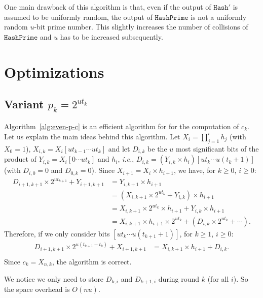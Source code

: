 \documentclass[twoside,envcountsame,runningheads]{llncs}
\newcommand{\Hash}{\ensuremath{\mathtt{Hash}}}
\newcommand{\HashPrime}{\ensuremath{\mathtt{HashPrime}}}
\begin{document}
One main drawback of this algorithm is that, even if the output of $\Hash'$ is assumed to be uniformly random, the output of $\HashPrime$ is not a uniformly random $u$-bit prime number.
This slightly increases the number of collisions of $\HashPrime$ and $u$ has to be increased subsequently.

\section{Optimizations}

\subsection{Variant $p_k = 2^{ut_k}$}

Algorithm~\ref{alg:even-p-c} is an efficient algorithm for for the computation of $c_k$.
Let us explain the main ideas behind this algorithm.
Let $X_i = \prod_{j=1}^i h_j$ (with $X_0 = 1$), $X_{i,k} = X_i[ut_{k-1}\cdots ut_{k}]$ and let $D_{i,k}$ be the $u$ most significant bits of the product of $Y_{i,k} = X_i[0\cdots ut_{k}]$ and $h_i$, {\it i.e.}, $D_{i,k} = (Y_{i,k} \times h_i)[ut_k\cdots u(t_k+1)]$ (with $D_{i,0} = 0$ and $D_{0,k} = 0$).
Since $X_{i+1} = X_i \times h_{i+1}$, we have, for $k \ge 0$, $i \ge 0$:
\begin{align*}
  D_{i+1,k+1} \times 2^{ut_{k+1}} + Y_{i+1,k+1} &= Y_{i,k+1} \times h_{i+1} \\
                 &= (X_{i,k+1} \times 2^{ut_{k}} + Y_{i,k}) \times h_{i+1} \\
                 &= X_{i,k+1} \times 2^{ut_k} \times h_{i+1} + Y_{i,k} \times h_{i+1} \\
                 &= X_{i,k+1}  \times h_{i+1} \times 2^{ut_k} + (D_{i,k} \times 2^{ut_k} + \cdots).
\end{align*}
Therefore, if we only consider bits $[ut_k \cdots u(t_{k+1}+1)]$, for $k\ge1$, $i\ge0$:
\begin{align*}
  D_{i+1,k+1} \times 2^{u(t_{k+1}-t_k)} + X_{i+1,k+1} &= X_{i,k+1} \times h_{i+1} + D_{i,k}. \\
\end{align*}
Since $c_k = X_{n,k}$, the algorithm is correct.

We notice we only need to store $D_{k,i}$ and $D_{k+1,i}$ during round $k$ (for all $i$).
So the space overhead is $O(nu)$.
\end{document}
